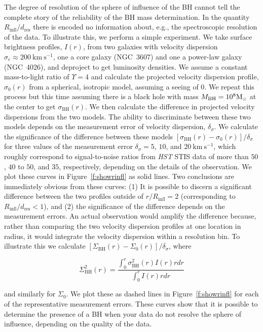 \documentclass[twosided,letterpaper,numberedappendix]{emulateapj}
\newcommand{\beq}{
\begin{equation}
}
\newcommand{\eeq}{
\end{equation}
}
\newcommand{\msun}     {\ensuremath{{\rm M}_{\scriptscriptstyle \odot}}}
\newcommand{\kms}      {\ensuremath{~\mathrm{km~s^{-1}}}}
\newcommand{\mbh}      {\ensuremath{M_{\mathrm{BH}}}}
\newcommand{\rinfres} {\ensuremath{R_{\mathrm{infl}} / d_{\mathrm{res}}}}
\begin{document}
The degree of resolution of the sphere of influence of the BH cannot
tell the complete story of the reliability of the BH mass
determination.  In the quantity $\rinfres$ there is encoded no
information about, e.g., the spectroscopic resolution of the data.  To
illustrate this, we perform a simple experiment.  We take surface
brightness profiles, $I(r)$, from two galaxies with velocity
dispersion $\sigma_e \approx 200 \kms$, one a core galaxy (NGC~3607)
and one a power-law galaxy (NGC~4026), and deproject to get luminosity
densities.  We assume a constant mass-to-light ratio of $\Upsilon = 4$
and calculate the projected velocity dispersion profile, $\sigma_0(r)$
from a spherical, isotropic model, assuming a seeing of 0.  We
repeat this process but this time assuming there is a black hole with
mass $\mbh = 10^8 \msun$ at the center to get $\sigma_\mathrm{BH}(r)$.
We then calculate the difference in projected velocity dispersions
from the two models.  The ability to discriminate between these two
models depends on the measurement error of velocity dispersion,
$\delta_\sigma$.  We calculate the significance of the difference
between these models $[\sigma_\mathrm{BH}(r) - \sigma_0(r)] /
\delta_\sigma$ for three values of the measurement error
$\delta_\sigma = 5$, $10$, and $20 \kms$, which roughly correspond to
signal-to-noise ratios from \emph{HST} STIS data of more than $50$,
$40$ to $50$, and $35$, respectively, depending on the details of the
observation.  We plot these curves in Figure~\ref{f:showrinfl} as
solid lines.  Two conclusions are immediately obvious from these
curves: (1) It is possible to discern a significant difference between
the two profiles outside of $r / R_\mathrm{infl} = 2$ (corresponding
to $\rinfres < 1$), and (2) the significance of the difference depends
on the measurement errors.  An actual observation would amplify the
difference because, rather than comparing the two velocity dispersion
profiles at one location in radius, it would integrate the velocity
dispersion within a resolution bin.  To illustrate this we calculate
$[\Sigma_\mathrm{BH}(r) - \Sigma_0(r)] / \delta_\sigma$, where
%
\beq
\Sigma^2_\mathrm{BH}(r) = \frac{\int_0^r \sigma^2_\mathrm{BH}(r) I(r) r dr}{\int_0^r I(r) r dr}
\eeq
%
and similarly for $\Sigma_0$.  We plot these as dashed lines in
Figure~\ref{f:showrinfl} for each of the representative measurement
errors.  These curves show that it is possible to determine the
presence of a BH when your data do not resolve the sphere of
influence, depending on the quality of the data.
\end{document}

